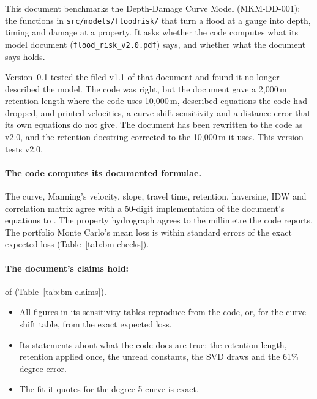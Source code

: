 \documentclass[11pt,a4paper]{article}
\begin{document}
\sloppy

\mkmtitlepage
\mkmlegalpage

\tableofcontents
\clearpage

\mkmexecsummary

This document benchmarks the Depth-Damage Curve Model (MKM-DD-001): the functions in
\texttt{src/models/floodrisk/} that turn a flood at a gauge into depth, timing and damage
at a property. It asks whether the code computes what its model document
(\texttt{flood\_risk\_v2.0.pdf}) says, and whether what the document says holds.

Version~0.1 tested the filed v1.1 of that document and found it no longer described the
model. The code was right, but the document gave a 2{,}000\,m retention length where the
code uses 10{,}000\,m, described equations the code had dropped, and printed velocities,
a curve-shift sensitivity and a distance error that its own equations do not give. The
document has been rewritten to the code as v2.0, and the retention docstring corrected
to the 10{,}000\,m it uses. This version tests v2.0.

\paragraph{The code computes its documented formulae.} The curve, Manning's velocity,
slope, travel time, retention, haversine, IDW and correlation matrix agree with a
50-digit implementation of the document's equations to \bmCodeErr. The property
hydrograph agrees to the millimetre the code reports. The portfolio Monte Carlo's mean
loss is within \bmZ{} standard errors of the exact expected loss
(Table~\ref{tab:bm-checks}). \bmWolframConfirms

\paragraph{The document's claims hold:} \bmClaimsMet{} of \bmClaims{}
(Table~\ref{tab:bm-claims}).
\begin{itemize}[leftmargin=*,nosep]
\item All \bmFigures{} figures in its sensitivity tables reproduce from the code, or, for
  the curve-shift table, from the exact expected loss.
\item Its statements about what the code does are true: the retention length, retention
  applied once, the unread constants, the SVD draws and the 61\% degree error.
\item The fit it quotes for the degree-5 curve is exact.
\end{itemize}
\end{document}
